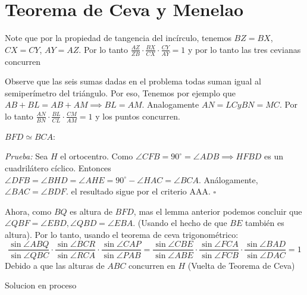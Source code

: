 \section{Teorema de Ceva y Menelao}

\begin{sol}
	Note que por la propiedad de tangencia del inc\'irculo, tenemos $BZ =BX$, $CX = CY$, $AY = AZ$. Por lo tanto $\frac{AZ}{ZB}\cdot \frac{BX}{CX} \cdot \frac{CY}{AY} = 1$ y por lo tanto las tres cevianas concurren
\end{sol}

\begin{sol}
	Observe que las seis sumas dadas en el problema todas suman igual al semiper\'imetro del tri\'angulo. Por eso, Tenemos por ejemplo que $AB+BL = AB + AM \implies BL = AM$. Analogamente $AN = LC y BN = MC$. Por lo tanto $\frac{AN}{BN}\cdot \frac{BL}{CL} \cdot \frac{CM}{AM} = 1$ y los puntos concurren.
\end{sol}

\begin{sol}
	\begin{lem}
		$BFD \simeq BCA$:
	\end{lem}
	\textit{Prueba:} Sea $H$ el ortocentro. Como $\angle{CFB} = 90^{\circ} = \angle{ADB} \implies  HFBD $ es un cuadril\'atero c\'iclico. Entonces $\angle{DFB} =\angle{BHD} = \angle{AHE} = 90^{\circ} - \angle {HAC} = \angle{BCA}$. An\'alogamente, $\angle{BAC } = \angle{BDF}$. el resultado sigue por el criterio AAA. $\square$
	
	Ahora, como $BQ$ es altura de $BFD$, mas el lemma anterior podemos concluir que $\angle{QBF} = \angle{EBD}, \angle{QBD} = \angle{EBA}$. (Usando el hecho de que $BE$ tambi\'en es altura). Por lo tanto, usando el teorema de ceva trigonom\'etrico:
	\begin{equation}
	\frac{\sin{\angle{ABQ}}}{\sin{\angle{QBC}}} \cdot\frac{\sin{\angle{BCR}}}{\sin{\angle{RCA}}} \cdot\frac{\sin{\angle{CAP}}}{\sin{\angle{PAB}}} = \frac{\sin{\angle{CBE}}}{\sin{\angle{ABE}}} \cdot\frac{\sin{\angle{FCA}}}{\sin{\angle{FCB}}} \cdot\frac{\sin{\angle{BAD}}}{\sin{\angle{DAC}}} = 1
	\end{equation}
	Debido a que las alturas de $ABC$ concurren en $H$ (Vuelta de Teorema de Ceva)
\end{sol}

\begin{sol}
	Solucion en proceso
\end{sol}

